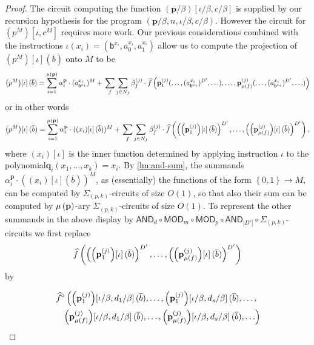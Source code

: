 \documentclass[11pt,a4paper]{amsart}
\newcommand{\set}[1]{{\left\{ {#1} \right\} }}
\newcommand{\card}[1]{\left| #1 \right|}
\newcommand{\po}[1]{{\mathbf {#1}}}
\renewcommand{\o}[1]{\overline {#1}}
\newcommand{\map}{\longrightarrow}
\newcommand{\h}[1]{\widehat{#1}}
\newcommand{\progg}[4]{\left(#1,#2,#3,#4\right)}
\newcommand{\prog}[2]{\left(#1\right)\!\left[#2\right]}
\newcommand{\progb}[3]{\left(#1\right)\!\left[#2,#3\right]}
\newcommand{\fcirc}[1]{#1^\circ}
\renewcommand{\b}{\textsf{b}}
\newcommand{\true}{1}
\newcommand{\false}{0}
\newcommand{\bool}{\set{\false,\true}}
\newcommand{\sumpk}[2]{\Sigma_{(#1,#2)}}
\newcommand{\ccc}{c}    \newcommand{\s}{s}
\newcommand{\ccand}{\mathsf{AND}}
\newcommand{\ccmod}{\mathsf{MOD}}
\begin{document}
\begin{proof}
The circuit computing the function $\progb{\po p/\beta}{\iota/\beta}{\ccc/\beta}$ is supplied by our recursion hypothesis for the program $\progg{\po p/\beta}{n}{\iota/\beta}{\ccc/\beta}$.
However the circuit for $\progb{p^M}{\iota}{\ccc^M}$ requires more work.
Our previous considerations combined with the instructions $\iota(x_i)=(\b^{x_i},a^{x_i}_0,a^{x_i}_1)$ allow us to compute the projection of
$\prog{p^M}{\iota}(\o b)$ onto $M$ to be
\[
\prog{p^M}{\iota}(\o b) =
\sum_{i=1}^{\ar{\po p}} \alpha^{\po p}_i\cdot (a^{x_i}_{\b^{x_i}})^M +
\\
\sum_{f} \sum_{j\in N_f} \beta^{(j)}_f \cdot
 \h{f}\left(\po{p}_1^{(j)}(\ldots,(a^{x_i}_{\b^{x_i}})^{D'},\ldots),\ldots,
\po{p}_{\ar{f}}^{(j)}(\ldots,(a^{x_i}_{\b^{x_i}})^{D'},\ldots)\right)
\]
or in other words
\[
\prog{p^M}{\iota}(\o b) =
\sum_{i=1}^{\ar{\po p}} \alpha^{\po p}_i\cdot (\prog{x_i}{\iota}(\o b))^M +
\\
\sum_{f} \sum_{j\in N_f} \beta^{(j)}_f \cdot
\h{f}\left(\left(\prog{\po p_1^{(j)}}{\iota}(\o b)\right)^{D'},\ldots,
\left(\prog{\po p_{\ar{f}}^{(j)}}{\iota}(\o b)\right)^{D'}\right),
\]
where $\prog{x_i}{\iota}$ is the inner function determined by applying instruction $\iota$ to the polynomial\break $\po q_i(x_1,\ldots,x_k)=x_i$.
By \cref{lm:and-sum}, the summands $\alpha^{\po p}_i\cdot (\prog{x_i}{\iota}(\o b))^M$,
as (essentially) the functions of the form $\bool\map M$, can be computed
by $\sumpk{p}{k}$-circuits of size $O(1)$,
so that also their sum can be computed
by $\ar{\po p}$-ary $\sumpk{p}{k}$-circuits of size $O(1)$.
To represent the other summands in the above display by
$\ccand_d\circ\ccmod_{m}\circ\ccmod_p
\circ\ccand_{\card{D'}}\circ\sumpk{p}{k}$-circuits
we first replace
\[
\h{f}\left(\left(\prog{\po p_1^{(j)}}{\iota}(\o b)\right)^{D'},\ldots,
\left(\prog{\po p_{\ar{f}}^{(j)}}{\iota}(\o b)\right)^{D'}\right)
\]
by

\begin{multline*}
\fcirc{\h{f}} \left( \progb{\po p_1^{(j)}}{\iota/\beta}{d_1/\beta}(\o b), \ldots, \progb{\po p_1^{(j)}}{\iota/\beta}{d_s/\beta}(\o b), \ldots, \right. \\
\quad \left. \progb{\po p_{\ar{f}}^{(j)}}{\iota/\beta}{d_1/\beta}(\o b), \ldots, \progb{\po p_{\ar{f}}^{(j)}}{\iota/\beta}{d_s/\beta}(\o b), \ldots \right)
\end{multline*}


\end{proof}
\end{document}
